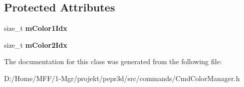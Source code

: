 \subsection*{Protected Attributes}
\begin{DoxyCompactItemize}
\item 
\mbox{\label{classpepr3d_1_1_cmd_color_manager_swap_colors_ab844b45f5817551eb8cf94a6a79e8562}} 
size\+\_\+t {\bfseries m\+Color1\+Idx}
\item 
\mbox{\label{classpepr3d_1_1_cmd_color_manager_swap_colors_aaf0ac35ec3fad9416ce04a2e3af135d8}} 
size\+\_\+t {\bfseries m\+Color2\+Idx}
\end{DoxyCompactItemize}


The documentation for this class was generated from the following file\+:\begin{DoxyCompactItemize}
\item 
D\+:/\+Home/\+M\+F\+F/1-\/\+Mgr/projekt/pepr3d/src/commands/Cmd\+Color\+Manager.\+h\end{DoxyCompactItemize}
